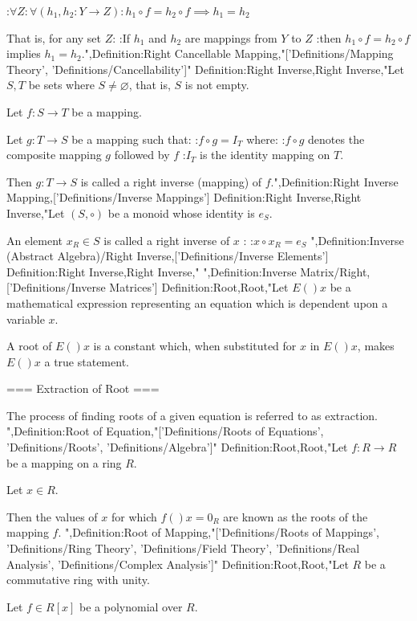 :$\forall Z: \forall \left( h_1, h_2: Y \to Z \right): h_1 \circ f = h_2 \circ f \implies h_1 = h_2$

That is,  for any set $Z$:
:If $h_1$ and $h_2$ are mappings from $Y$ to $Z$
:then $h_1 \circ f = h_2 \circ f$ implies $h_1 = h_2$.",Definition:Right Cancellable Mapping,"['Definitions/Mapping Theory', 'Definitions/Cancellability']"
Definition:Right Inverse,Right Inverse,"Let $S, T$ be sets where $S \ne \varnothing$, that is, $S$ is not empty.

Let $f: S \to T$ be a mapping.


Let $g: T \to S$ be a mapping such that:
:$f \circ g = I_T$
where:
:$f \circ g$ denotes the composite mapping $g$ followed by $f$
:$I_T$ is the identity mapping on $T$.


Then $g: T \to S$ is called a right inverse (mapping) of $f$.",Definition:Right Inverse Mapping,['Definitions/Inverse Mappings']
Definition:Right Inverse,Right Inverse,"Let $\left( S, \circ \right)$ be a monoid whose identity is $e_S$.

An element $x_R \in S$ is called a right inverse of $x$ :
:$x \circ x_R = e_S$
",Definition:Inverse (Abstract Algebra)/Right Inverse,['Definitions/Inverse Elements']
Definition:Right Inverse,Right Inverse,"
",Definition:Inverse Matrix/Right,['Definitions/Inverse Matrices']
Definition:Root,Root,"Let $E \left(   \right)x$ be a mathematical expression representing an equation which is dependent upon a variable $x$.

A root of $E \left(   \right)x$ is a constant which, when substituted for $x$ in $E \left(   \right)x$, makes $E \left(   \right)x$ a true statement.


=== Extraction of Root ===

The process of finding roots of a given equation is referred to as extraction.
",Definition:Root of Equation,"['Definitions/Roots of Equations', 'Definitions/Roots', 'Definitions/Algebra']"
Definition:Root,Root,"Let $f: R \to R$ be a mapping on a ring $R$.

Let $x \in R$.


Then the values of $x$ for which $f \left(   \right)x = 0_R$ are known as the roots of the mapping $f$.
",Definition:Root of Mapping,"['Definitions/Roots of Mappings', 'Definitions/Ring Theory', 'Definitions/Field Theory', 'Definitions/Real Analysis', 'Definitions/Complex Analysis']"
Definition:Root,Root,"Let $R$ be a commutative ring with unity.

Let $f \in R \left[ x \right]$ be a polynomial over $R$.


